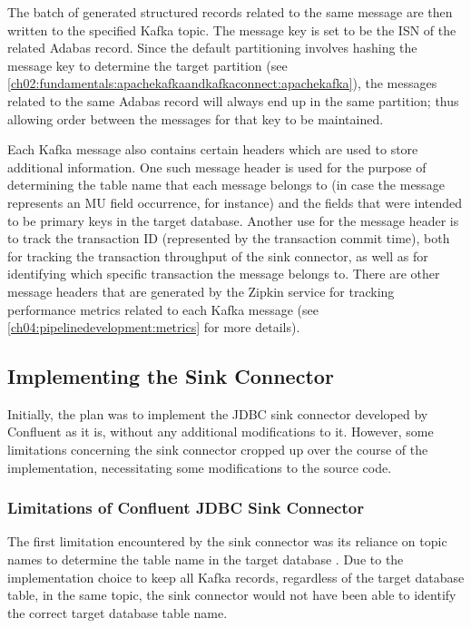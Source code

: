 The batch of generated structured records related to the same message are then written to the specified Kafka topic. The message key is set to be the \ac{ISN} of the related Adabas record. Since the default partitioning involves hashing the message key to determine the target partition (see \ref{ch02:fundamentals:apachekafkaandkafkaconnect:apachekafka}), the messages related to the same Adabas record will always end up in the same partition; thus allowing order between the messages for that key to be maintained.

Each Kafka message also contains certain headers which are used to store additional information. One such message header is used for the purpose of determining the table name that each message belongs to (in case the message represents an MU field occurrence, for instance) and the fields that were intended to be primary keys in the target database. Another use for the message header is to track the transaction ID (represented by the transaction commit time), both for tracking the transaction throughput of the sink connector, as well as for identifying which specific transaction the message belongs to. There are other message headers that are generated by the Zipkin service for tracking performance metrics related to each Kafka message (see \ref{ch04:pipelinedevelopment:metrics} for more details).


\subsection{Implementing the Sink Connector}
Initially, the plan was to implement the \ac{JDBC} sink connector developed by Confluent as it is, without any additional modifications to it. However, some limitations concerning the sink connector cropped up over the course of the implementation, necessitating some modifications to the source code.

\subsubsection{Limitations of Confluent JDBC Sink Connector}
The first limitation encountered by the sink connector was its reliance on topic names to determine the table name in the target database \cite{jdbcsinkdocumentation}. Due to the implementation choice to keep all Kafka records, regardless of the target database table, in the same topic, the sink connector would not have been able to identify the correct target database table name.

